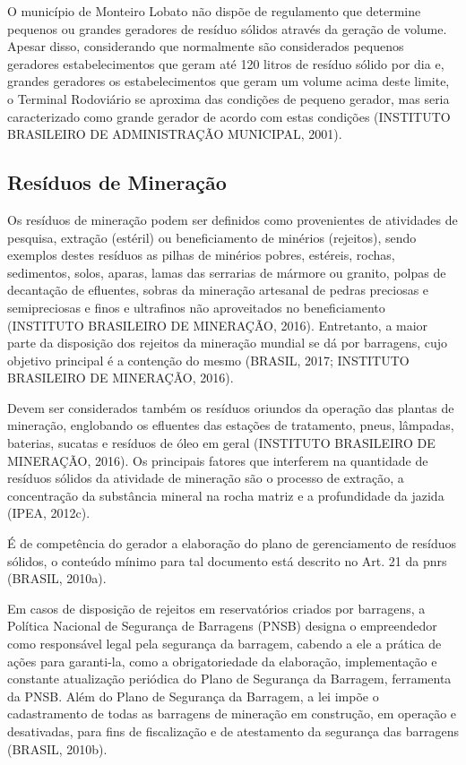 	O município de Monteiro Lobato não dispõe de regulamento que determine pequenos ou grandes geradores de resíduo sólidos através da geração de volume. Apesar disso, considerando que normalmente são considerados pequenos geradores estabelecimentos que geram até 120 litros de resíduo sólido por dia e, grandes geradores os estabelecimentos que geram um volume acima deste limite, o Terminal Rodoviário se aproxima das condições de pequeno gerador, mas seria caracterizado como grande gerador de acordo com estas condições (INSTITUTO BRASILEIRO DE ADMINISTRAÇÃO MUNICIPAL, 2001).
	
	
	\subsection{Resíduos de Mineração}
	Os resíduos de mineração podem ser definidos como provenientes de atividades de pesquisa, extração (estéril) ou beneficiamento de minérios (rejeitos), sendo exemplos destes resíduos as pilhas de minérios pobres, estéreis, rochas, sedimentos, solos, aparas, lamas das serrarias de mármore ou granito, polpas de decantação de efluentes, sobras da mineração artesanal de pedras preciosas e semipreciosas e finos e ultrafinos não aproveitados no beneficiamento (INSTITUTO BRASILEIRO DE MINERAÇÃO, 2016). Entretanto, a maior parte da disposição dos rejeitos da mineração mundial se dá por barragens, cujo objetivo principal é a contenção do mesmo (BRASIL, 2017; INSTITUTO BRASILEIRO DE MINERAÇÃO, 2016).
	
	Devem ser considerados também os resíduos oriundos da operação das plantas de mineração, englobando os efluentes das estações de tratamento, pneus, lâmpadas, baterias, sucatas e resíduos de óleo em geral (INSTITUTO BRASILEIRO DE MINERAÇÃO, 2016). Os principais fatores que interferem na quantidade de resíduos sólidos da atividade de mineração são o processo de extração, a concentração da substância mineral na rocha matriz e a profundidade da jazida (IPEA, 2012c).
	
	É de competência do gerador a elaboração do plano de gerenciamento de resíduos sólidos, o conteúdo mínimo para tal documento está descrito no Art. 21 da \gls{pnrs} (BRASIL, 2010a).
	
	Em casos de disposição de rejeitos em reservatórios criados por barragens, a Política Nacional de Segurança de Barragens (PNSB) designa o empreendedor como responsável legal pela segurança da barragem, cabendo a ele a prática de ações para garanti-la, como a obrigatoriedade da elaboração, implementação e constante atualização periódica do Plano de Segurança da Barragem, ferramenta da PNSB. Além do Plano de Segurança da Barragem, a lei impõe o cadastramento de todas as barragens de mineração em construção, em operação e desativadas, para fins de fiscalização e de atestamento da segurança das barragens (BRASIL, 2010b).

